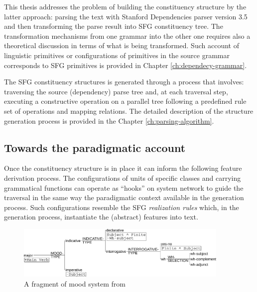 
This thesis addresses the problem of building the constituency structure by the latter approach: parsing the text with Stanford Dependencies parser version 3.5 \citep{Marneffe2008a,Marneffe2008, Marneffe2014} and then transforming the parse result into SFG constituency tree. The transformation mechanisms from one grammar into the other one requires also a theoretical discussion in terms of what is being transformed. Such account of linguistic primitives or configurations of primitives in the source grammar corresponds to SFG primitives is provided in Chapter \ref{ch:dependecy-grammar}. 

The SFG constituency structures is generated through a process that involves: traversing the source (dependency) parse tree and, at each traversal step, executing a constructive operation on a parallel tree following a predefined rule set of operations and mapping relations. The detailed description of the structure generation process is provided in the Chapter \ref{ch:parsing-algorithm}. 


\subsection{Towards the paradigmatic account}
\label{sec:paradigmatic-account}
Once the constituency structure is in place it can inform the following feature derivation process. The configurations of units of specific classes and carrying grammatical functions can operate as ``hooks'' on system network to guide the traversal in the same way the paradigmatic context available in the generation process. Such configurations resemble the SFG \textit{realization rules} which, in the generation process, instantiate the (abstract) features into text. 

\begin{figure}[!ht]
    \centering      
    \includegraphics[width=0.91\textwidth]{Figures/Example/just-mood.pdf}      
    \caption{A fragment of mood system from \citet[366]{Halliday2013}}
    \label{fig:just-mood}
\end{figure}

